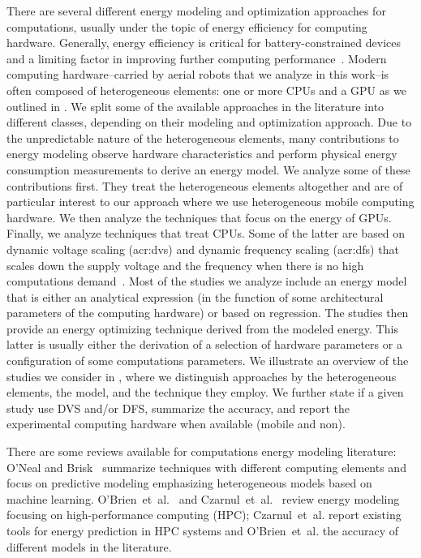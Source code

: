 There are several different energy modeling and optimization approaches for computations, usually under the topic of energy efficiency for computing hardware. Generally, energy efficiency is critical for battery-constrained devices~\citep{rao2005battery} and a limiting factor in improving further computing performance~\citep{horowitz2014computing}. 
Modern computing hardware--carried by aerial robots that we analyze in this work--is often composed of heterogeneous elements: one or more CPUs and a GPU as we outlined in . We split some of the available approaches in the literature into different classes, depending on their modeling and optimization approach. Due to the unpredictable nature of the heterogeneous elements, many contributions to energy modeling observe hardware characteristics and perform physical energy consumption measurements to derive an energy model. We analyze some of these contributions first. They treat the heterogeneous elements altogether and are of particular interest to our approach where we use heterogeneous mobile computing hardware. We then analyze the techniques that focus on the energy of GPUs. Finally, we analyze techniques that treat CPUs. Some of the latter are based on dynamic voltage scaling (\Gls{acr:dvs}) and dynamic frequency scaling (\Gls{acr:dfs}) that scales down the supply voltage and the frequency when there is no high computations demand~\citep{flautner2001automatic, chen2009fundamentals}. Most of the studies we analyze include an energy model that is either an analytical expression (in the function of some architectural parameters of the computing hardware) or based on regression. The studies then provide an energy optimizing technique derived from the modeled energy. This latter is usually either the derivation of a selection of hardware parameters or a configuration of some computations parameters. We illustrate an overview of the studies we consider in , where we distinguish approaches by the heterogeneous elements, the model, and the technique they employ. We further state if a given study use DVS and/or DFS, summarize the accuracy, and report the experimental computing hardware when available (mobile and non).

There are some reviews available for computations energy modeling literature: O'Neal and Brisk~\citep{oneal2018predictive} summarize techniques with different computing elements and focus on predictive modeling emphasizing heterogeneous models based on machine learning. O'Brien~et~al.~\citep{obrien2017survey} and Czarnul~et~al.~\citep{czarnul2019energy} review energy modeling focusing on high-performance computing (HPC); Czarnul~et~al. report existing tools for energy prediction in HPC systems and O'Brien~et~al. the accuracy of different models in the literature.


